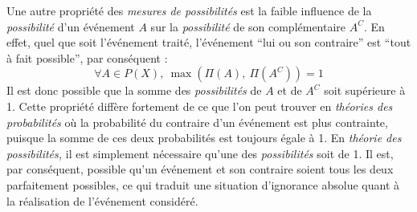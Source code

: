 Une autre propriété des \emph{mesures de possibilités} est la faible
influence de la \emph{possibilité} d'un événement \(A\) sur la
\emph{possibilité} de son complémentaire \(A^C\). En effet, quel que
soit l’événement traité, l'événement \enquote{lui ou son contraire}
est \enquote{tout à fait possible}, par conséquent :
%
\begin{equation}
  \label{eq:poss_cont}
  ∀ A ∈ P(X),\ \max(Π(A),\ Π(A^C)) = 1  
\end{equation}
%
Il est donc possible que la somme des \emph{possibilités} de \(A\) et
de \(A^C\) soit supérieure à 1. Cette propriété diffère fortement de
ce que l'on peut trouver en \emph{théories des probabilités} où la
probabilité du contraire d'un événement est plus contrainte, puisque
la somme de ces deux probabilités est toujours égale à 1. En
\emph{théorie des possibilités,} il est simplement nécessaire qu'une
des \emph{possibilités} soit de 1. Il est, par conséquent, possible
qu'un événement et son contraire soient tous les deux parfaitement
possibles, ce qui traduit une situation d'ignorance absolue quant à la
réalisation de l'événement considéré.

